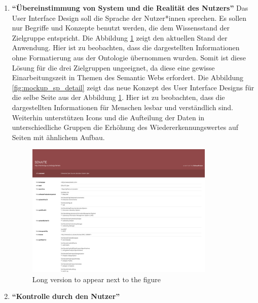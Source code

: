 \begin{enumerate}
\item \textbf{\enquote{\"Ubereinstimmung von System und die Realität des Nutzers}} \newline
Das User Interface Design soll die Sprache der Nutzer*innen sprechen.
Es sollen nur Begriffe und Konzepte benutzt werden, die dem Wissensstand der Zielgruppe entspricht.
Die Abbildung \ref{fig:point2_before} zeigt den aktuellen Stand der Anwendung.
Hier ist zu beobachten, dass die dargestellten Informationen ohne Formatierung aus der Ontologie übernommen wurden.
Somit ist diese Lösung für die drei Zielgruppen ungeeignet, da diese eine gewisse Einarbeitungszeit in Themen des Semantic Webs erfordert.
Die Abbildung \ref{fig:mockup_sp_detail} zeigt das neue Konzept des User Interface Designs für die selbe Seite aus der Abbildung \ref{fig:point2_before}.
Hier ist zu beobachten, dass die dargestellten Informationen für Menschen lesbar und verständlich sind.
Weiterhin unterstützen Icons und die Aufteilung der Daten in unterschiedliche Gruppen die Erhöhung des Wiedererkennungswertes auf Seiten mit ähnlichem Aufbau.

\begin{figure}
	\centering
    	\includegraphics[width=0.85\textwidth]{Images/Punkt_2_davor}
   	\caption[Detailansicht Softwareprodukt]{Long version to appear next to the figure}
   	\label{fig:point2_before}
\end{figure}

\clearpage


\item \textbf{\enquote{Kontrolle durch den Nutzer}} \newline


\end{enumerate}
